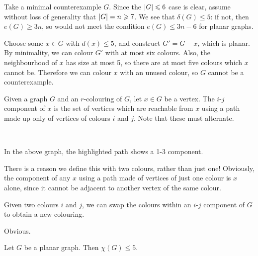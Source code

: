 \documentclass{article}
\begin{document}
\begin{prf}
    Take a minimal counterexample $G$. Since the $\left\lvert G \right\rvert \leqslant 6$ case is clear, assume without loss of generality that $\left\lvert G \right\rvert = n \geqslant 7$. We see that $\delta(G) \leq 5$: if not, then $e(G) \geq 3n$, so would not meet the condition $e(G) \leq 3n - 6$ for planar graphs.

	Choose some $x \in G$ with $d(x) \leq 5$, and construct $G' = G - x$, which is planar. By minimality, we can colour $G'$ with at most six colours. Also, the neighbourhood of $x$ has size at most 5, so there are at most five colours which $x$ cannot be. Therefore we can colour $x$ with an unused colour, so $G$ cannot be a counterexample.
\end{prf}

\begin{definition}[$i$-$j$ Component]
    Given a graph $G$ and an $r$-colouring of $G$, let $x \in G$ be a vertex. The $i$-$j$ component of $x$ is the set of vertices which are reachable from $x$ using a path made up only of vertices of colours $i$ and $j$. Note that these must alternate.
    
    \  \
    
    In the above graph, the highlighted path shows a 1-3 component.
\end{definition}

\begin{note}
	There is a reason we define this with two colours, rather than just one! Obviously, the component of any $x$ using a path made of vertices of just one colour is $x$ alone, since it cannot be adjacent to another vertex of the same colour.
\end{note}

\begin{proposition}
	Given two colours $i$ and $j$, we can swap the colours within an $i$-$j$ component of $G$ to obtain a new colouring.
\end{proposition}

\begin{prf}
    Obvious.
\end{prf}

\begin{theorem}
    \label{5-colour-theorem}
	Let $G$ be a planar graph. Then $\chi(G) \leq 5$.
\end{theorem}
\end{document}
